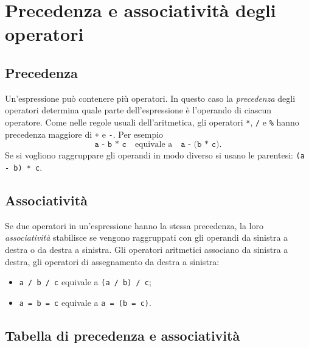\documentclass[11pt,a4paper]{article}
\begin{document}
\section{Precedenza e associatività degli operatori}

\subsection{Precedenza}

Un'espressione può contenere più operatori. In questo caso la \emph{precedenza} degli operatori determina quale parte dell'espressione è l'operando di ciascun operatore. Come nelle regole usuali dell'aritmetica, gli operatori \lstinline|*|, \lstinline|/| e \lstinline|%| hanno precedenza maggiore di \lstinline|+| e \lstinline|-|. Per esempio
\[
\texttt{a - b * c}\quad\text{equivale a}\quad\texttt{a - (b * c)}.
\]
Se si vogliono raggruppare gli operandi in modo diverso si usano le parentesi: \lstinline|(a - b) * c|.

\subsection{Associatività}

Se due operatori in un'espressione hanno la stessa precedenza, la loro \emph{associatività} stabilisce se vengono raggruppati con gli operandi da sinistra a destra o da destra a sinistra. Gli operatori aritmetici associano da sinistra a destra, gli operatori di assegnamento da destra a sinistra:
\begin{itemize}
    \item \lstinline|a / b / c| equivale a \lstinline|(a / b) / c|;
    \item \lstinline|a = b = c| equivale a \lstinline|a = (b = c)|.
\end{itemize}

\subsection{Tabella di precedenza e associatività}
\end{document}
